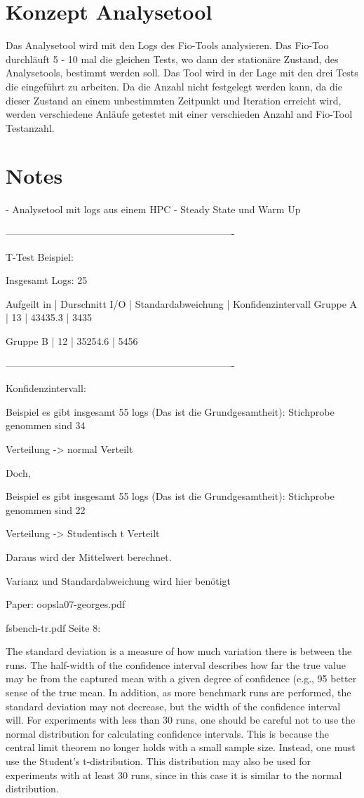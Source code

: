\section{Konzept Analysetool}
Das Analysetool wird mit den Logs des Fio-Tools analysieren.
Das Fio-Too durchläuft 5 - 10 mal die gleichen Tests, wo dann der stationäre Zustand, des Analysetools,
bestimmt werden soll. Das Tool wird in der Lage mit den drei Tests die eingeführt zu arbeiten.
Da die Anzahl nicht festgelegt werden kann, da die dieser Zustand an einem unbestimmten Zeitpunkt und Iteration erreicht wird,
werden verschiedene Anläufe getestet mit einer verschieden Anzahl and Fio-Tool Testanzahl.

\section{Notes}

- Analysetool mit logs aus einem HPC
- Steady State und Warm Up

----------------------------------------------------------------------

T-Test Beispiel:

Insgesamt Logs: 25

Aufgeilt in 	| Durschnitt I/O | Standardabweichung | Konfidenzintervall
Gruppe A | 13	| 43435.3	 | 3435

Gruppe B | 12	| 35254.6	 | 5456	

----------------------------------------------------------------------

Konfidenzintervall:

Beispiel es gibt insgesamt 55 logs (Das ist die Grundgesamtheit):
Stichprobe genommen sind 34

Verteilung -> normal Verteilt

Doch,

Beispiel es gibt insgesamt 55 logs (Das ist die Grundgesamtheit):
Stichprobe genommen sind 22

Verteilung -> Studentisch t Verteilt

Daraus wird der Mittelwert berechnet.

Varianz und Standardabweichung wird hier benötigt

Paper: oopsla07-georges.pdf

fsbench-tr.pdf Seite 8:

The standard deviation is a measure of how much variation there is between the
runs. The half-width of the confidence interval describes how far the true value may be
from the captured mean with a given degree of confidence (e.g., 95%
better sense of the true mean. In addition, as more benchmark runs are performed, the
standard deviation may not decrease, but the width of the confidence interval will.
For experiments with less than 30 runs, one should be careful not to use the normal
distribution for calculating confidence intervals. This is because the central limit theorem
no longer holds with a small sample size. Instead, one must use the Student’s t-distribution.
This distribution may also be used for experiments with at least 30 runs, since in this case
it is similar to the normal distribution.

